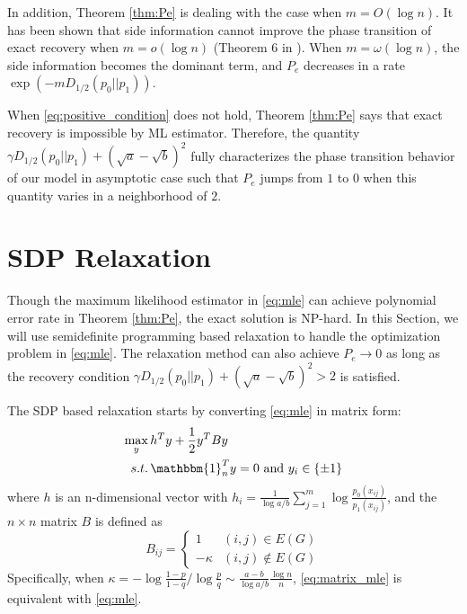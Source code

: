 \documentclass[conference]{IEEEtran}
\begin{document}
In addition, Theorem \ref{thm:Pe} is dealing with the case when $m=O(\log n)$. It has been shown
that side information cannot improve the phase transition of exact recovery when $m=o(\log n)$ (Theorem 6 in \cite{saad2018community}). When $m=\omega(\log n)$,
the side information becomes the dominant term, and $P_e$ decreases in a rate $\exp(-m D_{1/2}(p_0||p_1) )$.

When \eqref{eq:positive_condition} does not hold, Theorem \ref{thm:Pe} says that exact recovery is impossible by ML estimator.
Therefore, the quantity $\gamma D_{1/2}(p_0||p_1) + (\sqrt{a} - \sqrt{b})^2$ fully characterizes the 
phase transition behavior of our model in asymptotic case such that $P_e$ jumps from $1$ to $0$ when this quantity varies in a neighborhood of $2$.
\section{SDP Relaxation}
Though the maximum likelihood estimator in \eqref{eq:mle} can achieve polynomial
error rate in Theorem \ref{thm:Pe}, the exact solution is NP-hard. In this
Section, we will use semidefinite programming based relaxation to handle
the optimization problem in \eqref{eq:mle}. The relaxation method
can also achieve $P_e\to 0$ as long as the recovery condition
$\gamma D_{1/2}(p_0||p_1) + (\sqrt{a} - \sqrt{b})^2 > 2$ is satisfied.

The SDP based relaxation starts by converting \eqref{eq:mle} in matrix form:
\begin{align}
\max_{y}\, & h^T y + \frac{1}{2}y^T B y \notag \\
s.t.\, & \mathbbm{1}_n^T y = 0 \text{ and } y_i \in \{\pm 1 \} \label{eq:matrix_mle}
\end{align}
where $h$ is an n-dimensional vector with $h_i = \frac{1}{\log a/b}\sum_{j=1}^m \log \frac{p_0(x_{ij})}{p_1(x_{ij})}$, and the $n\times n $ matrix $B$ is defined as
\begin{equation}
B_{ij} = \begin{cases}
1 & (i,j)\in E(G) \\
-\kappa & (i,j) \not\in E(G)
\end{cases}
\end{equation}
Specifically, when $\kappa = -\log\frac{1-p}{1-q} / \log\frac{p}{q} \sim \frac{a-b}{\log a/b}\frac{\log n}{n}$, \eqref{eq:matrix_mle} is equivalent with \eqref{eq:mle}. 
\end{document}

